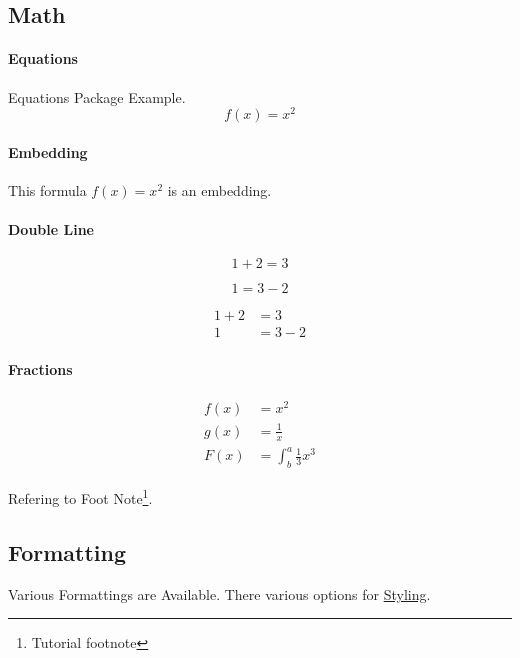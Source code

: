 \documentclass{report}[a4paper,12pt] %
\begin{document}
\subsection{Math}

\paragraph{Equations}
Equations Package Example.
\begin{equation}
  f(x) = x^2
\end{equation}

\paragraph{Embedding}

This formula $f(x) = x^2$ is an embedding.

\paragraph*{Double Line}

\begin{equation*}
  1 + 2 = 3 
\end{equation*}

\begin{equation*}
  1 = 3 - 2
\end{equation*}

\begin{align*}
  1 + 2 &= 3\\
  1 &= 3 - 2
\end{align*}

\paragraph{Fractions}

\begin{align*}
  f(x) &= x^2\\
  g(x) &= \frac{1}{x}\\
  F(x) &= \int^a_b \frac{1}{3}x^3
\end{align*}

Refering to Foot Note\footnote{\label{myfootnote}Tutorial footnote}.

\subsection{Formatting}
Various \hypertarget{sen:formatopts}{Formattings} are Available. There various options for \href{https://www.overleaf.com/learn/latex/Font_sizes%2C_families%2C_and_styles}{Styling}.
\end{document}
